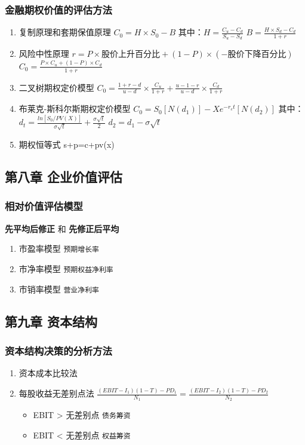 \documentclass[12pt,a4paper]{article}
\begin{document}
\subsubsection{金融期权价值的评估方法}
\label{sec:orgf6afc50}
\begin{enumerate}
\item 复制原理和套期保值原理
\label{sec:org390d6d5}
\(C_{0}=H\times S_{0}-B\)
其中：\(H = \frac{C_{u}-C_d}{S_u-S_d}\)
\(B=\frac{H\times S_{d}-C_{d}}{1+r}\)
\item 风险中性原理
\label{sec:orgae9a713}
\(r = P\times 股价上升百分比 + (1-P)\times(-股价下降百分比)\)
\(C_0=\frac{P\times C_u+(1-P)\times C_d}{1+r}\)
\item 二叉树期权定价模型
\label{sec:orgeebaef6}
\(C_0=\frac{1+r-d}{u-d}\times \frac{C_u}{1+r}+\frac{u-1-r}{u-d}\times \frac{C_{d}}{1+r}\)
\item 布莱克-斯科尔斯期权定价模型
\label{sec:org095af27}
\(C_0=S_0[N(d_1)]-Xe^{-r_{e}t}[N(d_{2})]\)
其中：\(d_t=\frac{ln[S_{0}/PV(X)]}{\sigma\sqrt{t}}+\frac{\sigma\sqrt{t}}{2}\)
    \(d_{2}=d_1-\sigma \sqrt{t}\)
\item 期权恒等式
\label{sec:org058c28b}
s+p=c+pv(x)
\end{enumerate}
\subsection{第八章 企业价值评估}
\label{sec:orgb90621c}
\subsubsection{相对价值评估模型}
\label{sec:org504d972}
\textbf{先平均后修正} 和 \textbf{先修正后平均}
\begin{enumerate}
\item 市盈率模型
\label{sec:org47f8e14}
\texttt{预期增长率}
\item 市净率模型
\label{sec:org951c2bc}
\texttt{预期权益净利率}
\item 市销率模型
\label{sec:org87c6058}
\texttt{营业净利率}
\end{enumerate}
\subsection{第九章 资本结构}
\label{sec:org95acbc9}
\subsubsection{资本结构决策的分析方法}
\label{sec:org3b49b47}
\begin{enumerate}
\item 资本成本比较法
\label{sec:org319ba9f}
\item 每股收益无差别点法
\label{sec:orgd64c020}
\(\frac{(EBIT-I_{1})(1-T)-PD_{1}}{N_{1}}=\frac{(EBIT-I_{2})(1-T)-PD_2}{N_{2}}\)
\begin{itemize}
\item EBIT > 无差别点  \texttt{债务筹资}
\item EBIT < 无差别点  \texttt{权益筹资}
\end{itemize}
\end{enumerate}
\end{document}
